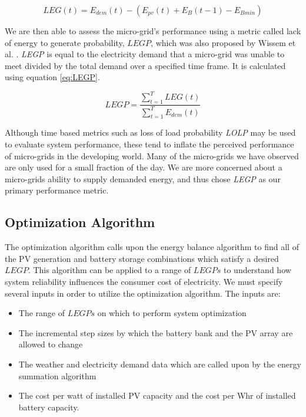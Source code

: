 \documentclass[11p]{article}
\begin{document}
\begin{equation} \label{eq:LEG}
LEG(t) = E_{dem} (t) - (E_{pv} (t)+E_B(t-1)-E_{Bmin})
\end{equation}

We are then able to assess the micro-grid's performance using a metric called lack of energy to generate probability, $LEGP$, which was also proposed by Wissem et al. \cite{Wissem}.
\emph{LEGP} is equal to the electricity demand that a micro-grid was unable to meet divided by the total demand over a specified time frame.
It is calculated using equation \ref{eq:LEGP}.

\begin{equation} \label{eq:LEGP}
LEGP = \frac{\sum_{t=1}^T LEG(t)}{\sum_{t=1}^T E_{dem} (t)}
\end{equation}

Although time based metrics such as loss of load probability \emph{LOLP} may be used to evaluate system performance, these tend to inflate the perceived performance of micro-grids in the developing world.
Many of the micro-grids we have observed are only used for a small fraction of the day.
We are more concerned about a micro-grids ability to supply demanded energy, and thus chose \emph{LEGP} as our primary performance metric.


\subsection{Optimization Algorithm}

The optimization algorithm calls upon the energy balance algorithm to find all of the PV generation and battery storage combinations which satisfy a desired $LEGP$. This algorithm can be applied to a range of $LEGPs$ to understand how system reliability influences the consumer cost of electricity. We must specify several inputs in order to utilize the optimization algorithm. The inputs are:

\begin{itemize}

\setlength{\itemsep}{1pt}%
\item The range of $LEGPs$ on which to perform system optimization
\item The incremental step sizes by which the battery bank and the PV array are allowed to change
\item The weather and electricity demand data which are called upon by the energy summation algorithm
\item The cost per watt of installed PV capacity and the cost per Whr of installed battery capacity. 
\end{itemize}
\end{document}
